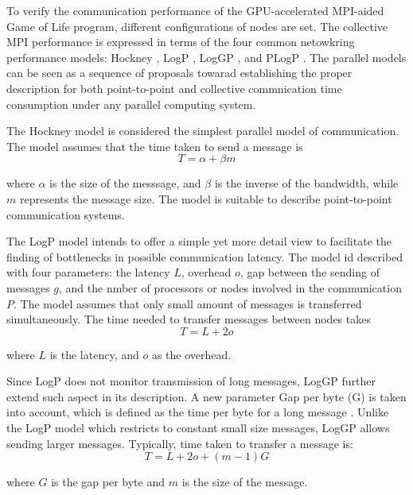 
To verify the communication performance of the GPU-accelerated MPI-aided Game of Life program, different configurations of nodes are set. The collective MPI performance is expressed in terms of the four common netowkring performance models: Hockney \cite{hockney1994communication}, LogP \cite{culler1993logp}, LogGP \cite{alexandrov1995loggp}, and PLogP \cite{kielmann2000fast}. The parallel models can be seen as a sequence of proposals towarad establishing the proper description for both point-to-point and collective commnication time consumption under any parallel computing system.

The Hockney model is considered the simplest parallel model of communication. The model assumes that the time taken to send a message is 
\begin{equation*}
T = \alpha + \beta m
\end{equation*}

where $\alpha$ is the size of the messsage, and $\beta$ is the inverse of the bandwidth, while $m$ represents the message size. The model is suitable to describe point-to-point communication systems. 

The LogP model intends to offer a simple yet more detail view to facilitate the finding of bottlenecks in possible communication latency. The model id described with four parameters: the latency $L$, overhead $o$, gap between the sending of messages $g$, and the nmber of processors or nodes involved in the communication $P$. The model assumes that only small amount of messages is transferred simultaneously. The time needed to transfer messages between nodes takes 
\begin{equation*}
T = L + 2o
\end{equation*}

where $L$ is the latency, and $o$ as the overhead.

Since LogP does not monitor transmission of long messages, LogGP further extend such aspect in its description. A new parameter  Gap per byte (G) is taken into account, which is defined as the time per byte for a long message \cite{alexandrov1995loggp}. Unlike the LogP model which restricts to constant small size messages, LogGP allows sending larger messages. Typically, time taken to transfer a message is:
\begin{equation*}
T = L + 2o + (m - 1)G
\end{equation*}

where $G$ is the gap per byte and $m$ is the size of the message.

